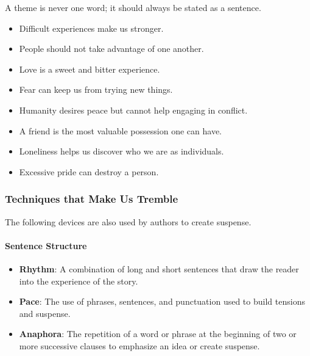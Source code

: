 \begin{note}
  \label{nte:scary_stories_theme}

  A theme is never one word; it should always be stated as a sentence.

  \begin{itemize}
    \label{item:themes}

    \item Difficult experiences make us stronger.
    \item People should not take advantage of one another.
    \item Love is a sweet and bitter experience.
    \item Fear can keep us from trying new things.
    \item Humanity desires peace but cannot help engaging in conflict.
    \item A friend is the most valuable possession one can have.
    \item Loneliness helps us discover who we are as individuals.
    \item Excessive pride can destroy a person.
  \end{itemize}
\end{note}


\subsubsection{Techniques that Make Us Tremble}
\label{sub_sub_sec:techniques_that_make_us_tremble}

The following devices are also used by authors to create suspense.

\paragraph{Sentence Structure}
\label{par:sentence_structure}

\begin{itemize}
  \label{item:sentence_structure}

  \item \textbf{Rhythm}: A combination of long and short sentences that draw the
    reader into the experience of the story.
  \item \textbf{Pace}: The use of phrases, sentences, and punctuation used to
    build tensions and suspense.
  \item \textbf{Anaphora}: The repetition of a word or phrase at the beginning
    of two or more successive clauses to emphasize an idea or create suspense.
\end{itemize}


